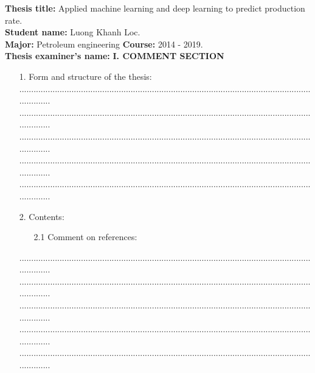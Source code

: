 \documentclass[12pt,a4paper]{report}
\begin{document}
\textbf{Thesis title:} Applied machine learning and deep learning to predict production rate.\\
\textbf{Student name:} Luong Khanh Loc.\\
\textbf{Major:} Petroleum engineering \hspace*{3cm}\textbf{Course:} 2014 - 2019.\\
\textbf{Thesis examiner's name:}
\newline
\newline
\textbf{I. COMMENT SECTION}
\begin{enumerate}
	\item[1.] Form and structure of the thesis:\\
	........................................................................................................................................\\........................................................................................................................................\\........................................................................................................................................\\........................................................................................................................................\\........................................................................................................................................
	\item[2.] Contents: 
	\begin{enumerate}
		\item[2.1] Comment on references:
	\end{enumerate}
	\item[] ........................................................................................................................................\\........................................................................................................................................\\........................................................................................................................................\\........................................................................................................................................\\........................................................................................................................................

\end{enumerate}
\end{document}
